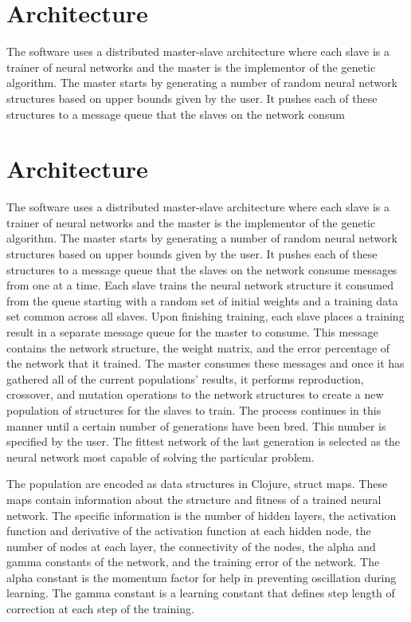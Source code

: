 \section{Architecture}
The software uses a distributed master-slave architecture where each slave is a trainer of neural networks and the master is the implementor of the genetic algorithm. The master starts by generating a number of random neural network structures based on upper bounds given by the user. It pushes each of these structures to a message queue that the slaves on the network consum\section{Architecture}
The software uses a distributed master-slave architecture where each slave is a trainer of neural networks and the master is the implementor of the genetic algorithm. The master starts by generating a number of random neural network structures based on upper bounds given by the user. It pushes each of these structures to a message queue that the slaves on the network consume messages from one at a time. Each slave trains the neural network structure it consumed from the queue starting with a random set of initial weights and a training data set common across all slaves. Upon finishing training, each slave places a training result in a separate message queue for the master to consume. This message contains the network structure, the weight matrix, and the error percentage of the network that it trained. The master consumes these messages and once it has gathered all of the current populations' results, it performs reproduction, crossover, and mutation operations to the network structures to create a new population of structures for the slaves to train. The process continues in this manner until a certain number of generations have been bred. This number is specified by the user. The fittest network of the last generation is selected as the neural network most capable of solving the particular problem.  

The population are encoded as data structures in Clojure, struct maps. These maps contain information about the structure and fitness of a trained neural network. The specific information is the number of hidden layers, the activation function and derivative of the activation function at each hidden node, the number of nodes at each layer, the connectivity of the nodes, the alpha and gamma constants of the network, and the training error of the network. The alpha constant is the momentum factor for help in preventing oscillation during learning. The gamma constant is a learning constant that defines step length of correction at each step of the training.

